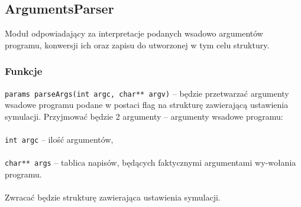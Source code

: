 \documentclass{article}
\begin{document}
\subsection{ArgumentsParser}
Moduł odpowiadający za interpretacje podanych wsadowo argumentów programu, konwersji ich oraz zapisu do utworzonej w tym celu struktury.

\subsubsection{Funkcje}
\texttt{params parseArgs(int argc, char** argv)} -- będzie przetwarzać argumenty wsadowe programu podane w postaci flag na strukturę zawierającą ustawienia symulacji. Przyjmować będzie 2 argumenty -- argumenty wsadowe programu:\\\\
	 \hspace*{10mm}\texttt{int argc} -- ilość argumentów,\\\\
	 \hspace*{10mm}\texttt{char** args} -- tablica napisów, będących faktycznymi argumentami wy-\hspace*{10mm}wołania programu.\\
\\
Zwracać będzie strukturę zawierająca ustawienia symulacji.
\end{document}
